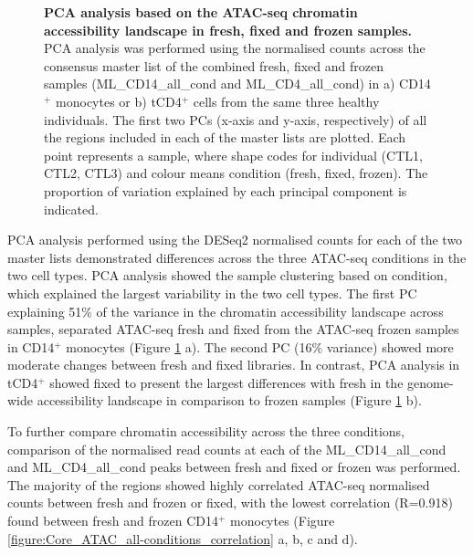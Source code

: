 \begin{figure}[htbp]
\begin{subfigure}{0.5\textwidth}
\caption{\textbf{}}
\end{subfigure}
\caption[PCA analysis based on the ATAC-seq chromatin accessibility landscape in fresh, fixed and frozen samples.]{\textbf{PCA analysis based on the ATAC-seq chromatin accessibility landscape in fresh, fixed and frozen samples.} PCA analysis was performed using the normalised counts across the consensus master list of the combined fresh, fixed and frozen samples (ML\_CD14\_all\_cond and ML\_CD4\_all\_cond) in a) CD14$^+$ monocytes or b) tCD4$^+$ cells from the same three healthy individuals. The first two PCs (x-axis and y-axis, respectively) of all the regions included in each of the master lists are plotted. Each point represents a sample, where shape codes for individual (CTL1, CTL2, CTL3) and colour means condition (fresh, fixed, frozen). The proportion of variation explained by each principal component is indicated.}
\label{figure:Core_ATAC_all_conditions_PCA}
\end{figure}



PCA analysis performed using the DESeq2 normalised counts for each of the two master lists demonstrated differences across the three ATAC-seq conditions in the two cell types. PCA analysis showed the sample clustering based on condition, which explained the largest variability in the two cell types. The first PC explaining 51\% of the variance in the chromatin accessibility landscape across samples, separated ATAC-seq fresh and fixed from the ATAC-seq frozen samples in CD14$^+$ monocytes (Figure \ref{figure:Core_ATAC_all_conditions_PCA} a). The second PC (16\% variance) showed more moderate changes between fresh and fixed libraries. In contrast, PCA analysis in tCD4$^+$ showed fixed to present the largest differences with fresh in the genome-wide accessibility landscape in comparison to frozen samples (Figure \ref{figure:Core_ATAC_all_conditions_PCA} b). 


To further compare chromatin accessibility across the three conditions, comparison of the normalised read counts at each of the ML\_CD14\_all\_cond and ML\_CD4\_all\_cond peaks between fresh and fixed or frozen was performed. The majority of the regions showed highly correlated ATAC-seq normalised counts between fresh and frozen or fixed, with the lowest correlation (R=0.918) found between fresh and frozen CD14$^+$ monocytes (Figure \ref{figure:Core_ATAC_all-conditions_correlation} a, b, c and d). 


